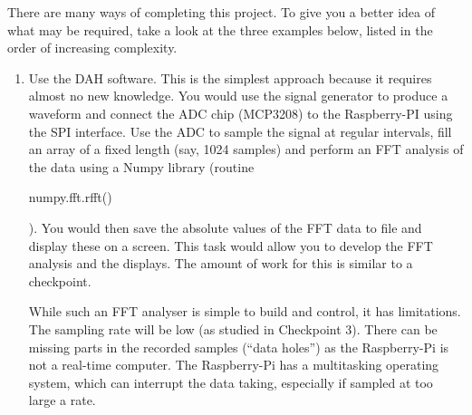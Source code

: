 There are many ways of completing this project. To give you a better idea of what may be required, take a look at the three examples below, listed in the order of increasing complexity. 

\begin{enumerate}
\item	Use the DAH software. This is the simplest approach because it requires almost no new knowledge. You would use the signal generator to produce a waveform and connect the ADC chip (MCP3208) to the Raspberry-PI using the SPI interface. Use the ADC to sample the signal at regular intervals, fill an array of a fixed length (say, 1024 samples) and perform an FFT analysis of the data using a Numpy library (routine  \begin{tt}numpy.fft.rfft()\end{tt}). You would then save the absolute values of the FFT data to file and display these on a screen. This task would allow you to develop the FFT analysis and the displays. The amount of work for this is similar to a checkpoint.

While such an FFT analyser is simple to build and control, it has limitations. The sampling rate will be low (as studied in Checkpoint 3). There can be missing parts in the recorded samples (``data holes'') as the Raspberry-Pi is not a real-time computer. The Raspberry-Pi has a multitasking operating system, which can interrupt the data taking, especially if sampled at too large a rate.


\end{enumerate}
